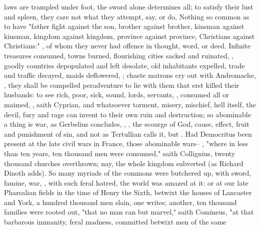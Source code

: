 laws are trampled under foot, the sword alone determines all; to satisfy their
lust and spleen, they care not what they attempt, say, or do,
Nothing so common as to have "father fight against the son,
brother against brother, kinsman against kinsman, kingdom against kingdom,
province against province, Christians against Christians:" , of whom they never had offence in thought,
word, or deed. Infinite treasures consumed, towns burned, flourishing cities
sacked and ruinated, , goodly countries
depopulated and left desolate, old inhabitants expelled, trade and traffic
decayed, maids deflowered, ; chaste matrons cry out with Andromache,
, they shall be compelled peradventure to lie with them that erst
killed their husbands: to see rich, poor, sick, sound, lords, servants,
, consumed all or maimed, \etc{} , saith Cyprian, and
whatsoever torment, misery, mischief, hell itself, the devil,
fury and rage can invent to their own ruin and destruction;
so abominable a thing is war, as Gerbelius concludes,
, \etc{}, the scourge of God, cause, effect, fruit and punishment
of sin, and not  as Tertullian calls it, but
. Had Democritus been present at the late civil wars in France, those
abominable wars-- , "where
in less than ten years, ten thousand men were consumed," saith Collignius,
twenty thousand churches overthrown; nay, the whole kingdom subverted (as
Richard Dinoth adds). So many myriads of the commons were
butchered up, with sword, famine, war, , with such feral hatred, the world was
amazed at it: or at our late Pharsalian fields in the time of Henry the Sixth,
betwixt the houses of Lancaster and York, a hundred thousand men slain,
one writes; another, ten thousand
families were rooted out, "that no man can but marvel," saith Comineus, "at
that barbarous immanity, feral madness, committed betwixt men of the same
